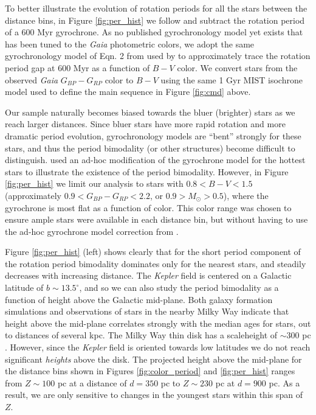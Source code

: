 \documentclass[preprint2]{aastex62}
\newcommand{\Kepler}{\textsl{Kepler}\xspace}
\begin{document}
To better illustrate the evolution of rotation periods for all the stars between the distance bins, in Figure \ref{fig:per_hist} we follow \citet{davenport2017} and subtract the rotation period of a 600 Myr gyrochrone. As no published gyrochronology model yet exists that has been tuned to the {\em Gaia} photometric colors, we adopt the same gyrochronology model of Eqn. 2 from \citet{meibom2009} used by \citet{davenport2017} to approximately trace the rotation period gap at 600 Myr as a function of $B-V$ color. We convert stars from the observed {\em Gaia} $G_{BP}-G_{RP}$ color to $B-V$ using the same 1 Gyr MIST isochrone model used to define the main sequence in Figure \ref{fig:cmd} above. 

Our sample naturally becomes biased towards the bluer (brighter) stars as we reach larger distances. Since bluer stars have more rapid rotation and more dramatic period evolution, gyrochronology models are ``bent'' strongly for these stars, and thus the period bimodality (or other structures) become difficult to distinguish. \citet{davenport2017} used an ad-hoc modification of the gyrochrone model for the hottest stars to illustrate the existence of the period bimodality. However, in Figure \ref{fig:per_hist} we limit our analysis to stars with $0.8<B-V<1.5$ (approximately $0.9<G_{BP}-G_{RP}<2.2$, or $0.9>M_\odot> 0.5$), where the gyrochrone is most flat as a function of color. This color range was chosen to ensure ample stars were available in each distance bin, but without having to use the ad-hoc gyrochrone model correction from \citet{davenport2017}.



Figure \ref{fig:per_hist} (left) shows clearly that for the short period component of the rotation period bimodality dominates only for the nearest stars, and steadily decreases with increasing distance.
The \Kepler field is centered on a Galactic latitude of $b\sim13.5^\circ$, and so we can also study the period bimodality as a function of height above the Galactic mid-plane.
Both galaxy formation simulations \citep{ma2017} and observations of stars in the nearby Milky Way \citep{xiang2017} indicate that height above the mid-plane correlates strongly with the median ages for stars, out to distances of several kpc. The Milky Way thin disk has a scaleheight of $\sim$300 pc \citep{gilmore1983}.
However, since the \Kepler field is oriented towards low latitudes we do not reach significant {\it heights} above the disk.
The projected height above the mid-plane for the distance bins shown in Figures \ref{fig:color_period} and \ref{fig:per_hist} ranges from $Z\sim100$ pc at a distance of $d=350$ pc to $Z\sim230$ pc at $d=900$ pc. As a result, we are only sensitive to changes in the youngest stars within this span of $Z$.
\end{document}

